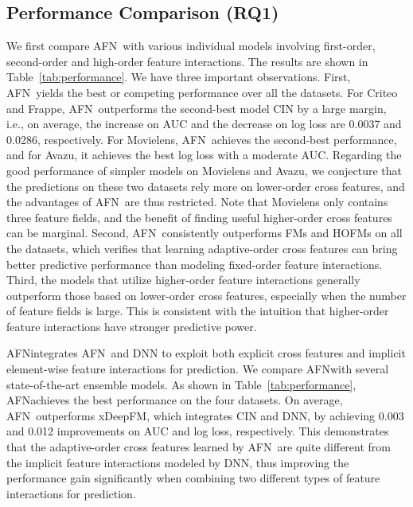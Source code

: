 \documentclass[letterpaper]{article} \usepackage{aaai20}  \usepackage{times}  \usepackage{helvet} \usepackage{courier}  \usepackage[hyphens]{url}  \usepackage{graphicx} \urlstyle{rm} \def\UrlFont{\rm}  \usepackage{graphicx}  \frenchspacing  \setlength{\pdfpagewidth}{8.5in}  \setlength{\pdfpageheight}{11in}
\newcommand{\model}{{AFN}~}
\newcommand{\modelns}{{AFN}}
\begin{document}
\subsection{Performance Comparison (RQ1)}

We first compare \model with various individual models involving first-order, second-order and high-order feature interactions.
The results are shown in Table~\ref{tab:performance}.
We have three important observations. First, \model yields the best or competing performance over all the datasets. For Criteo and Frappe, \model outperforms the second-best model CIN by a large margin, i.e., on average, the increase on AUC and the decrease on log loss are 0.0037 and 0.0286, respectively. For Movielens, \model achieves the second-best performance, and for Avazu, it achieves the best log loss with a moderate AUC. Regarding the good performance of simpler models on Movielens and Avazu, we conjecture that the predictions on these two datasets rely more on lower-order cross features, and the advantages of \model are thus restricted. Note that Movielens only contains three feature fields, and the benefit of finding useful higher-order cross features can be marginal.
Second, \model consistently outperforms FMs and HOFMs on all the datasets, which verifies that learning adaptive-order cross features can bring better predictive performance than modeling fixed-order feature interactions.
Third, the models that utilize higher-order feature interactions generally outperform those based on lower-order cross features, especially when the number of feature fields is large.
This is consistent with the intuition that higher-order feature interactions have stronger predictive power.

\modelns integrates \model and DNN to exploit both explicit cross features and implicit element-wise feature interactions for prediction. We compare \modelns with several state-of-the-art ensemble models.
As shown in Table~\ref{tab:performance}, \modelns achieves the best performance on the four datasets. On average, \model outperforms xDeepFM, which integrates CIN and DNN, by achieving 0.003 and 0.012 improvements on AUC and log loss, respectively. This demonstrates that the adaptive-order cross features learned by \model are quite different from the implicit feature interactions modeled by DNN, thus improving the performance gain significantly when combining two different types of feature interactions for prediction. 
\end{document}
